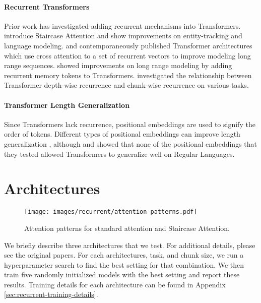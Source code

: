     \paragraph{Recurrent Transformers}
    Prior work has investigated adding recurrent mechanisms into Transformers. \citet{ju_staircase_2022} introduce Staircase Attention and show improvements on entity-tracking and language modeling.  \citet{hutchins_block-recurrent_2022} and \citet{didolkar_temporal_2022} contemporaneously published Transformer architectures which use cross attention to a set of recurrent vectors to improve modeling long range sequences. \citet{bulatov_recurrent_2022} showed improvements on long range modeling by adding recurrent memory tokens to Transformers. \citet{chowdhury_investigating_2024} investigated the relationship between Transformer depth-wise recurrence and chunk-wise recurrence on various tasks.
    
    \paragraph{Transformer Length Generalization}
    Since Transformers lack recurrence, positional embeddings are used to signify the order of tokens. Different types of positional embeddings can improve length generalization \citep{csordas_devil_2021, ruoss_randomized_2023, shaw_self-attention_2018, su_roformer_2024, zhou_transformers_2024, kazemnejad_impact_2023, press_train_2021}, although \citet{deletang_neural_2022} and \citet{ruoss_randomized_2023} showed that none of the positional embeddings that they tested allowed Transformers to generalize well on Regular Languages.
    
    \section{Architectures}
    \begin{wrapfigure}[27]{r}{0.3\linewidth}
        \centering
        \vspace{-3em}
        \texttt{[image: images/recurrent/attention patterns.pdf]}
        \caption{Attention patterns for standard attention and Staircase Attention.}
        \label{fig:attention-patterns}
        \vspace{-0em}
    \end{wrapfigure}
    
    We briefly describe three architectures that we test. For additional details, please see the original papers. For each architectures, task, and chunk size, we run a hyperparameter search to find the best setting for that combination. We then train five randomly initialized models with the best setting and report these results. Training details for each architecture can be found in Appendix \ref{sec:recurrent-training-details}.
    
